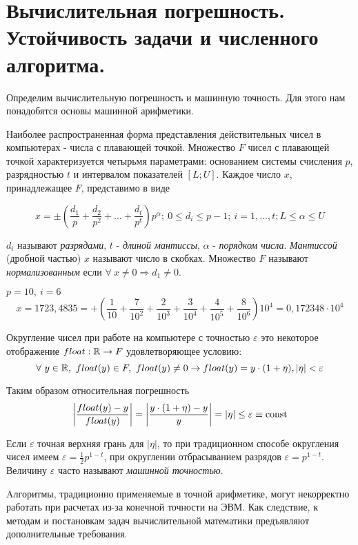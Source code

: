 \section{Вычислительная погрешность. Устойчивость задачи и численного алгоритма.}

Определим вычислительную погрешность и машинную точность.
Для этого нам понадобятся основы машинной арифметики.

Наиболее распространенная форма представления действительных чисел в
компьютерах - числа с плавающей точкой. Множество $F$ чисел с плавающей
точкой характеризуется четырьмя параметрами: основанием системы
счисления $p$, разрядностью $t$ и интервалом показателей $[L;U]$. Каждое
число $x$, принадлежащее $F$, представимо в виде

\[x=\pm\left(\frac{d_1}{p}+\frac{d_2}{p^2}+\ldots+\frac{d_t}{p^t}\right)p^{\alpha};\ 0\leq d_i\leq p-1;\ i=1,\ldots,t;L\leq\alpha\leq U\]

$d_i$ называют \textit{разрядами}, $t$ - \textit{длиной мантиссы}, $\alpha$ - \textit{порядком числа}.
\textit{Мантиссой} (дробной частью) $x$ называют число в скобках.
Множество $F$ называют \textit{нормализованным} если $\forall\ x\neq0\Rightarrow d_1\neq0$.

\begin{example}
  $p=10,\ i=6$
  \[x = 1723,4835=+\left(\frac{1}{10}+\frac{7}{10^2}+\frac{2}{10^3}+\frac{3}{10^4}+\frac{4}{10^5}+\frac{8}{10^6}\right)10^4=0,172348\cdot10^4\]
\end{example}

Округление чисел при работе на компьютере с точностью $\varepsilon$ это
некоторое отображение $float:\mathbb{R} \rightarrow F$ удовлетворяющее условию:
\[\forall\ y\in\R,\ float(y)\in F,\ float(y)\neq0\rightarrow float(y)=y\cdot(1+\eta),|\eta|<\varepsilon\]

Таким образом относительная погрешность
\[\left|\frac{float(y)-y}{float(y)}\right|=\left|\frac{y\cdot(1+\eta)-y}{y}\right|=\left|\eta\right|\leq\varepsilon\equiv\mathrm{const}\]

Если $\varepsilon$ точная верхняя грань для $|\eta|$,
то при традиционном способе округления чисел имеем $\varepsilon=\frac{1}{2}p^{1-t}$,
при округлении отбрасыванием разрядов $\varepsilon=p^{1-t}$.
Величину $\varepsilon$ часто называют \textit{машинной точностью}.

Aлгоритмы, традиционно применяемые в точной арифметике,
могут некорректно работать при расчетах из-за конечной точности
на ЭВМ. Как следствие, к методам и постановкам задач вычислительной
математики предъявляют дополнительные требования.

